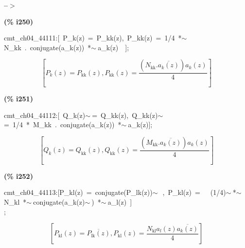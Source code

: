 \documentclass[fleqn]{article}
\begin{document}
\noindent
\begin{minipage}[t]{4.000000em}\color{red}\bfseries
 --\ensuremath{\ensuremath{>}}	
\end{minipage}
\begin{minipage}[t]{\textwidth}\color{blue}

\end{minipage}

\noindent%



\noindent
\begin{minipage}[t]{4.000000em}\color{red}\bfseries
(\% i250)	
\end{minipage}
\begin{minipage}[t]{\textwidth}\color{blue}
cmt\_ch04\_44111:[\ P\_k(z)\ =\ P\_kk(z),\ P\_kk(z)\ =\ 1/4\ *\ensuremath{\sim\ }N\_kk\ .\ conjugate(a\_k(z))\ *\ensuremath{\sim\ }a\_k(z)\ \ ];
\end{minipage}
\[\displaystyle \tag{\% o250} 
\left[ {P_k}(z)={P_{\ensuremath{\mathrm{kk}}}}(z)\operatorname{,}{P_{\ensuremath{\mathrm{kk}}}}(z)=\frac{\left( {N_{\ensuremath{\mathrm{kk}}}}\ensuremath{\mathrm{ . }}\overline{{a_k}(z)}\right)  {a_k}(z)}{4}\right] \mbox{}
\]


\noindent
\begin{minipage}[t]{4.000000em}\color{red}\bfseries
(\% i251)	
\end{minipage}
\begin{minipage}[t]{\textwidth}\color{blue}
cmt\_ch04\_44112:[\ Q\_k(z)\ensuremath{\sim\ }=\ Q\_kk(z),\ Q\_kk(z)\ensuremath{\sim\ }=\ 1/4\ *\ M\_kk\ .\ conjugate(a\_k(z))\ *\ensuremath{\sim\ }a\_k(z)];
\end{minipage}
\[\displaystyle \tag{\% o251} 
\left[ {Q_k}(z)={Q_{\ensuremath{\mathrm{kk}}}}(z)\operatorname{,}{Q_{\ensuremath{\mathrm{kk}}}}(z)=\frac{\left( {M_{\ensuremath{\mathrm{kk}}}}\ensuremath{\mathrm{ . }}\overline{{a_k}(z)}\right)  {a_k}(z)}{4}\right] \mbox{}
\]


\noindent
\begin{minipage}[t]{4.000000em}\color{red}\bfseries
(\% i252)	
\end{minipage}
\begin{minipage}[t]{\textwidth}\color{blue}
cmt\_ch04\_44113:[P\_kl(z)\ =\ conjugate(P\_lk(z))\ensuremath{\sim\ }\ ,\ P\_kl(z)\ =\ \ \ (1/4)\ensuremath{\sim\ }*\ensuremath{\sim\ }N\_kl\ *\ensuremath{\sim\ }conjugate(a\_k(z)\ensuremath{\sim\ })\ *\ensuremath{\sim\ }a\_l(z)\ ]\\
;
\end{minipage}
\[\displaystyle \tag{\% o252} 
\left[ {P_{\ensuremath{\mathrm{kl}}}}(z)=\overline{{P_{\ensuremath{\mathrm{lk}}}}(z)}\operatorname{,}{P_{\ensuremath{\mathrm{kl}}}}(z)=\frac{{N_{\ensuremath{\mathrm{kl}}}} {a_l}(z) \overline{{a_k}(z)}}{4}\right] \mbox{}
\]
\end{document}

